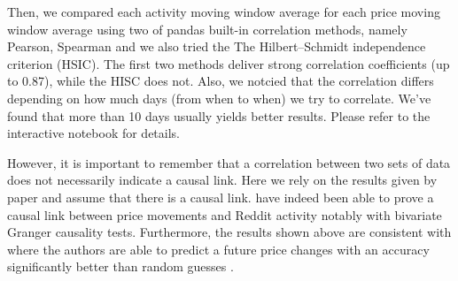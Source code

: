 

Then, we compared each activity moving window average for each price moving window average using two of pandas built-in correlation methods, namely Pearson, Spearman and we also tried the The Hilbert–Schmidt independence criterion (HSIC). The first two methods deliver strong correlation coefficients (up to 0.87), while the HISC does not. Also, we notcied that the correlation differs depending on how much days (from when to when) we try to correlate. We've found that more than 10 days usually yields better results. Please refer to the interactive notebook for details.



However, it is important to remember that a correlation between two sets of data does not necessarily indicate a causal link. Here we rely on the results given by paper  and assume that there is a causal link. \citeauthor{wooleyExtractingCryptocurrencyPrice2019} have indeed been able to prove a causal link between price movements and Reddit activity notably with bivariate Granger causality tests. Furthermore, the results shown above are consistent with  where the authors are able to predict a future price changes with an accuracy significantly better than random guesses \cite{iderCryptocurrencyReturnPrediction2022}.





